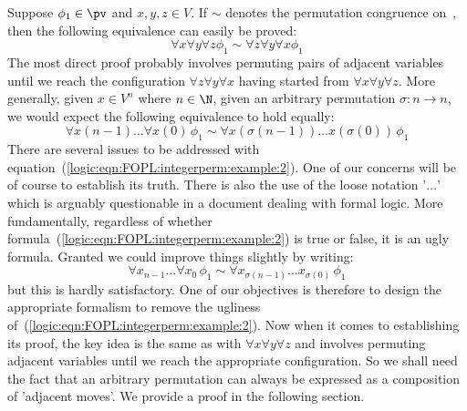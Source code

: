 Suppose $\phi_{1}\in\pv$ and $x,y,z\in V$. If $\sim$ denotes the
permutation congruence on~\pv, then the following equivalence can
easily be proved:
    \begin{equation}\label{logic:eqn:FOPL:integerperm:example:1}
    \forall x\forall y\forall z\phi_{1}\sim\forall z\forall y\forall
    x\phi_{1}
    \end{equation}
The most direct proof probably involves permuting pairs of adjacent
variables until we reach the configuration $\forall z\forall
y\forall x$ having started from $\forall x\forall y\forall z$. More
generally, given $x\in V^{n}$ where $n\in\N$, given an arbitrary
permutation $\sigma:n\to n$, we would expect the following
equivalence to hold equally:
    \begin{equation}\label{logic:eqn:FOPL:integerperm:example:2}
    \forall x(n-1)\ldots\forall x (0)\,\phi_{1}\sim\forall
    x(\sigma(n-1))\ldots x(\sigma(0))\,\phi_{1}
    \end{equation}
There are several issues to be addressed with
equation~(\ref{logic:eqn:FOPL:integerperm:example:2}). One of our
concerns will be of course to establish its truth. There is also the
use of the loose notation '$\ldots$' which is arguably questionable
in a document dealing with formal logic. More fundamentally,
regardless of whether
formula~(\ref{logic:eqn:FOPL:integerperm:example:2}) is true or
false, it is an ugly formula. Granted we could improve things
slightly by writing:
    \begin{equation}\label{logic:eqn:FOPL:integerperm:example:3}
    \forall x_{n-1}\ldots\forall x_{0}\,\phi_{1}\sim\forall
    x_{\sigma(n-1)}\ldots x_{\sigma(0)}\,\phi_{1}
    \end{equation}
but this is hardly satisfactory. One of our objectives is therefore
to design the appropriate formalism to remove the ugliness
of~(\ref{logic:eqn:FOPL:integerperm:example:2}). Now when it comes
to establishing its proof, the key idea is the same as with $\forall
x\forall y\forall z$ and involves permuting adjacent variables until
we reach the appropriate configuration. So we shall need the fact
that an arbitrary permutation can always be expressed as a
composition of 'adjacent moves'. We provide a proof in the following
section.
